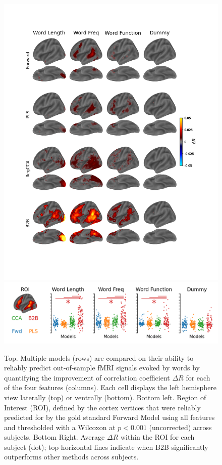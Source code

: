 \begin{figure}
  \begin{center}
          \includegraphics[width=.8\textwidth,
                       trim=1cm 1cm 2cm 2cm,
                       clip=True]{figures/fmri_delta_r.png}
          \includegraphics[width=.8\textwidth,
                       trim=0cm 0cm 0cm 0cm,
                       clip=True]{figures/fmri_strip.png}

      \label{fig:fmri_delta_r}
  \end{center}
  \caption{Top. Multiple models (rows) are compared on their ability to
  reliably predict out-of-sample fMRI signals evoked by words by quantifying
  the improvement of correlation coefficient $\Delta R$ for each of the four
  features (columns). Each cell displays the left hemisphere view laterally
  (top) or ventrally (bottom). Bottom left. Region
  of Interest (ROI), defined by the cortex vertices that were reliably
  predicted for by the gold standard Forward Model using all features and
  thresholded with a Wilcoxon at $p<0.001$ (uncorrected) across subjects. Bottom
  Right. Average $\Delta R$ within the ROI for each subject
  (dot); top horizontal lines indicate when B2B significantly outperforms
  other methods across subjects.}
\end{figure}


